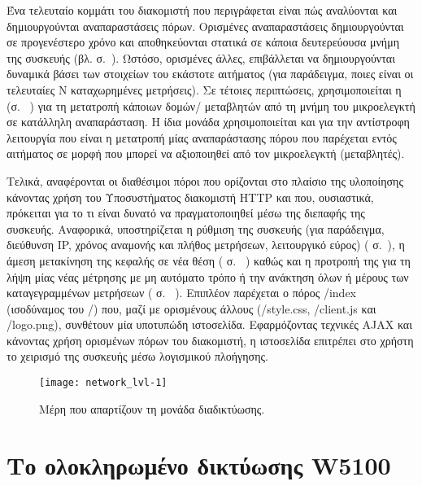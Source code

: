 Ένα τελευταίο κομμάτι του διακομιστή που περιγράφεται είναι πώς αναλύονται και
δημιουργούνται αναπαραστάσεις πόρων. Ορισμένες αναπαραστάσεις δημιουργούνται σε
προγενέστερο χρόνο και αποθηκεύονται στατικά σε κάποια δευτερεύουσα μνήμη της
συσκευής (βλ.  σ.~\pageref{subsec:network:files}).
Ωστόσο, ορισμένες άλλες, επιβάλλεται να δημιουργούνται δυναμικά βάσει των
στοιχείων του εκάστοτε αιτήματος (για παράδειγμα, ποιες είναι οι τελευταίες N
καταχωρημένες μετρήσεις). Σε τέτοιες περιπτώσεις, χρησιμοποιείται η
 (σ.~%
\pageref{subsec:network:representation}) για τη μετατροπή κάποιων δομών\slash{}%
μεταβλητών από τη μνήμη του μικροελεγκτή σε κατάλληλη αναπαράσταση. Η ίδια
μονάδα χρησιμοποιείται και για την αντίστροφη λειτουργία που είναι η μετατροπή
μίας αναπαράστασης πόρου που παρέχεται εντός αιτήματος σε μορφή που μπορεί να
αξιοποιηθεί από τον μικροελεγκτή (μεταβλητές).

Τελικά, αναφέρονται οι διαθέσιμοι πόροι που ορίζονται στο πλαίσιο της υλοποίησης
κάνοντας χρήση του Υποσυστήματος διακομιστή HTTP και που, ουσιαστικά, πρόκειται
για το τι είναι δυνατό να πραγματοποιηθεί μέσω της διεπαφής της συσκευής.
Αναφορικά, υποστηρίζεται η ρύθμιση της συσκευής (για παράδειγμα, διεύθυνση IP,
χρόνος αναμονής και πλήθος μετρήσεων, λειτουργικό εύρος)
( σ.~\pageref{subsec:network:config}), η άμεση
μετακίνηση της κεφαλής σε νέα θέση ( σ.~%
\pageref{subsec:network:coordinates}) καθώς και η προτροπή της για τη λήψη μίας
νέας μέτρησης με μη αυτόματο τρόπο ή την ανάκτηση όλων ή μέρους των
καταγεγραμμένων μετρήσεων ( σ.~%
\pageref{subsec:network:measurement}). Επιπλέον παρέχεται ο πόρος /index
(ισοδύναμος του /) που, μαζί με ορισμένους άλλους (/style.css, /client.js και
/logo.png), συνθέτουν μία υποτυπώδη ιστοσελίδα. Εφαρμόζοντας τεχνικές AJAX και
κάνοντας χρήση ορισμένων πόρων του διακομιστή, η ιστοσελίδα επιτρέπει στο χρήστη
το χειρισμό της συσκευής μέσω λογισμικού πλοήγησης.

\begin{figure}
    \caption{Μέρη που απαρτίζουν τη μονάδα διαδικτύωσης.
    \label{fig:network:lvl-1}}
    \begin{center}
    \texttt{[image: network\_lvl-1]}
    \end{center}
\end{figure}


\section{Το ολοκληρωμένο δικτύωσης W5100}
\label{sec:w5100}

